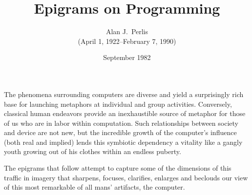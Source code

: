 \documentclass[letterpaper,11pt]{article}
\title{\textbf{Epigrams on Programming}}
\author{Alan J.\ Perlis\\(April 1, 1922--February 7, 1990)}
\date{September 1982}
\begin{document}
\thispagestyle{empty}

\maketitle

\begin{multicols}{2}
\noindent
The phenomena surrounding computers are diverse and yield a
surprisingly rich base for launching metaphors at individual
and group activities.
%
Conversely, classical human endeavors provide an inexhaustible
source of metaphor for those of us who are in labor within
computation.
%
Such relationships between society and device are not new, but
the incredible growth of the computer's influence (both real
and implied) lends this symbiotic dependency a vitality like
a gangly youth growing out of his clothes within an endless puberty.

The epigrams that follow attempt to capture some of the
dimensions of this traffic in imagery that sharpens,
focuses, clarifies, enlarges and beclouds our view of
this most remarkable of all mans' artifacts, the computer.


\end{multicols}
\end{document}
